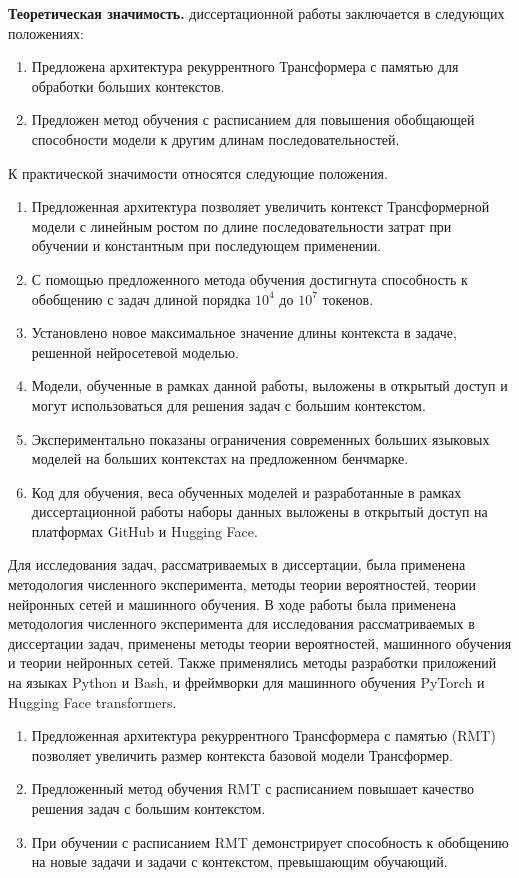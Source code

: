 \textbf{Теоретическая значимость.} диссертационной работы заключается в следующих положениях:
\begin{enumerate}
  \item Предложена архитектура рекуррентного Трансформера с памятью для обработки больших контекстов.
  \item Предложен метод обучения с расписанием для повышения обобщающей способности модели к другим длинам последовательностей.
\end{enumerate}

К практической значимости относятся следующие положения.
\begin{enumerate}
  \item Предложенная архитектура позволяет увеличить контекст Трансформерной модели с линейным ростом по длине последовательности затрат при обучении и константным при последующем применении.
  \item С помощью предложенного метода обучения достигнута способность к обобщению с задач длиной порядка $10^4$ до $10^7$ токенов.
  \item Установлено новое максимальное значение длины контекста в задаче, решенной нейросетевой моделью.
  \item Модели, обученные в рамках данной работы, выложены в открытый доступ и могут использоваться для решения задач с большим контекстом. 
  \item Экспериментально показаны ограничения современных больших языковых моделей на больших контекстах на предложенном бенчмарке.
  \item Код для обучения, веса обученных моделей и разработанные в рамках диссертационной работы наборы данных выложены в открытый доступ на платформах GitHub и Hugging Face.
\end{enumerate}

{\methods} Для исследования задач, рассматриваемых в диссертации, была применена методология численного эксперимента, методы теории вероятностей, теории нейронных сетей и машинного обучения. В ходе работы была применена методология численного эксперимента для исследования рассматриваемых в диссертации задач, применены методы теории вероятностей, машинного обучения и теории нейронных сетей. Также применялись методы разработки приложений на языках Python и Bash, и фреймворки для машинного обучения PyTorch и Hugging Face transformers.

{}
\begin{enumerate}[beginpenalty=10000] %
  \item Предложенная архитектура рекуррентного Трансформера с памятью (RMT) позволяет увеличить размер контекста базовой модели Трансформер. 
  \item Предложенный метод обучения RMT с расписанием повышает качество решения задач с большим контекстом. 
  \item При обучении с расписанием RMT демонстрирует способность к обобщению на новые задачи и задачи с контекстом, превышающим обучающий.
\end{enumerate}

